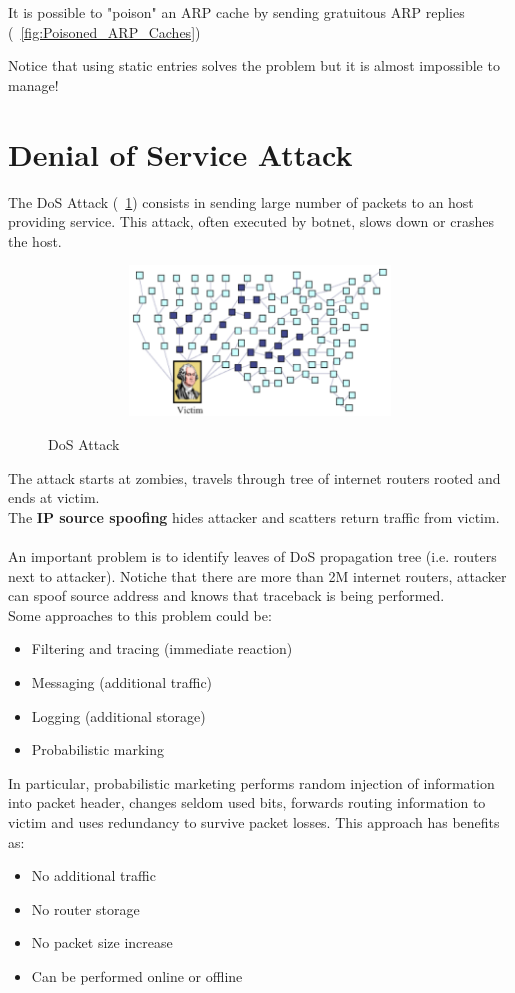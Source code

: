 It is possible to "poison" an ARP cache by sending gratuitous ARP replies (\figurename ~\ref{fig:Poisoned_ARP_Caches})

Notice that using static entries solves the problem but it is almost impossible to manage!

\section{Denial of Service Attack}
The DoS Attack (\figurename ~\ref{fig:DoS_Attack}) consists in sending large number of packets to an host providing service. This attack, often executed by botnet, slows down or crashes the host.\\ 
\begin{figure}[htbp]
	\centering%
	\subfigure%
	{\includegraphics[height=4cm, width=12cm, keepaspectratio]{Immagini/reti/DoS_Attack.png}}
	\caption{DoS Attack\label{fig:DoS_Attack}} 	
\end{figure}
The attack starts at zombies, travels through tree of internet routers rooted and ends at victim.\\
The \textbf{IP source spoofing} hides attacker and scatters return traffic from victim.\\ \\
An important problem is to identify leaves of DoS propagation tree (i.e. routers next to attacker). Notiche that there are more than 2M internet routers, attacker can spoof source address and knows that traceback is being performed.\\
Some approaches to this problem could be:
\begin{itemize}
\item Filtering and tracing (immediate reaction)
\item Messaging (additional traffic)
\item Logging (additional storage)
\item Probabilistic marking
\end{itemize}
In particular, probabilistic marketing performs random injection of information into packet header, changes seldom used bits, forwards routing information to victim and uses redundancy to survive packet losses. This approach has benefits as:
\begin{itemize}
\item No additional traffic
\item No router storage
\item No packet size increase
\item Can be performed online or offline
\end{itemize}

